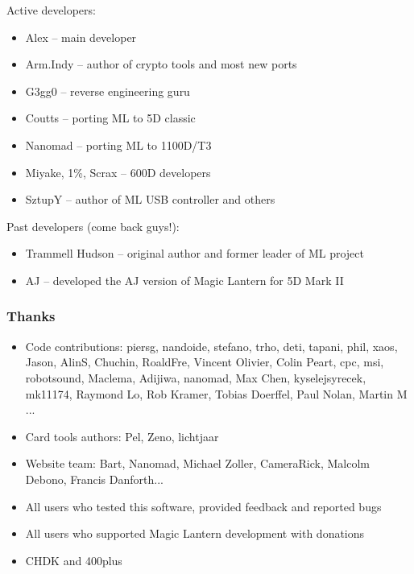 \documentclass[a4paper,english]{article}
\let\oldnewpage=\newpage
\def\newpage{\iq=0\oldnewpage\iq=1}
\let\oldsection=\section
\def\section{\newpage\oldsection}
\begin{document}
Active developers:
\begin{itemize}
\item Alex -- main developer
\item Arm.Indy -- author of crypto tools and most new ports
\item G3gg0 -- reverse engineering guru
\item Coutts -- porting ML to 5D classic
\item Nanomad -- porting ML to 1100D/T3
\item Miyake, 1\%, Scrax -- 600D developers
\item SztupY -- author of ML USB controller and others
\end{itemize}

Past developers (come back guys!):
\begin{itemize}
\item Trammell Hudson -- original author and former leader of ML project
\item AJ -- developed the AJ version of Magic Lantern for 5D Mark II
\end{itemize}
\newpage
\subsubsection*{Thanks}

\begin{itemize}
\item Code contributions: piersg, nandoide, stefano, trho, deti, tapani, phil, xaos, Jason, AlinS, Chuchin, RoaldFre, Vincent Olivier, Colin Peart, cpc, msi, robotsound, Maclema, Adijiwa, nanomad, Max Chen, kyselejsyrecek, mk11174, Raymond Lo, Rob Kramer, Tobias Doerffel, Paul Nolan, Martin M ...
\item Card tools authors: Pel, Zeno, lichtjaar
\item Website team: Bart, Nanomad, Michael Zoller, CameraRick, Malcolm Debono, Francis Danforth...
\item All users who tested this software, provided feedback and reported bugs
\item All users who supported Magic Lantern development with donations
\item CHDK and 400plus
\end{itemize}

\newpage

\def\tableofcontents{}

\end{document}
